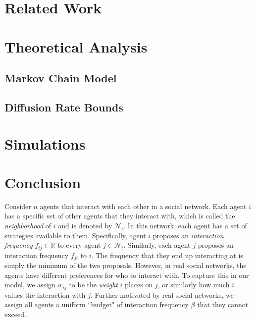 \documentclass[format=acmsmall, review=false]{acmart}
\begin{document}
\section{Related Work}

\par 


\section{Theoretical Analysis}

\subsection{Markov Chain Model}

\subsection{Diffusion Rate Bounds}

\section{Simulations}

\section{Conclusion}

\par Consider $n$ agents that interact with each other in a social network. Each agent $i$ has a specific set of other agents
that they interact with, which is called the \textit{neighborhood} of $i$ and is denoted by $\mathcal{N}_i$. In this network,
each agent has a set of strategies available to them. Specifically, agent $i$ proposes an \textit{interaction frequency}
$f_{ij} \in \mathbb{R}$ to every agent $j \in \mathcal{N}_i$. Similarly, each agent $j$ proposes an
interaction frequency $f_{ji}$ to $i$. The frequency that they end up interacting at is simply the minimum of the two
proposals. However, in real social networks, the agents have different preferences for who to interact with. To capture this
in our model, we assign $w_{ij}$ to be the \textit{weight} $i$ places on $j$, or similarly how much $i$ values the interaction
with $j$. Further motivated by real social networks, we assign all agents a uniform ``budget" of interaction frequency $\beta$
that they cannot exceed.
\end{document}
